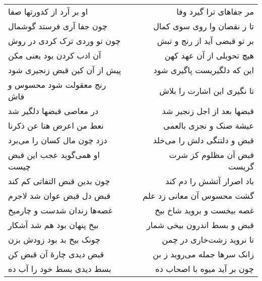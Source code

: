 \begin{center}
\begin{longtable}{l p{0.5cm} r}
\\
او بر آرد از کدورتها صفا
&&
مر جفاهای ترا گیرد وفا
\\
چون جفا آری فرستد گوشمال
&&
تا ز نقصان وا روی سوی کمال
\\
چون تو وردی ترک کردی در روش
&&
بر تو قبضی آید از رنج و تبش
\\
آن ادب کردن بود یعنی مکن
&&
هیچ تحویلی از آن عهد کهن
\\
پیش از آن کین قبض زنجیری شود
&&
این که دلگیریست پاگیری شود
\\
رنج معقولت شود محسوس و فاش
&&
تا نگیری این اشارت را بلاش
\\
در معاصی قبضها دلگیر شد
&&
قبضها بعد از اجل زنجیر شد
\\
نعط من اعرض هنا عن ذکرنا
&&
عیشة ضنک و نجزی بالعمی
\\
دزد چون مال کسان را می‌برد
&&
قبض و دلتنگی دلش را می‌خلد
\\
او همی‌گوید عجب این قبض چیست
&&
قبض آن مظلوم کز شرت گریست
\\
چون بدین قبض التفاتی کم کند
&&
باد اصرار آتشش را دم کند
\\
قبض دل قبض عوان شد لاجرم
&&
گشت محسوس آن معانی زد علم
\\
غصه‌ها زندان شدست و چارمیخ
&&
غصه بیخست و بروید شاخ بیخ
\\
بیخ پنهان بود هم شد آشکار
&&
قبض و بسط اندرون بیخی شمار
\\
چونک بیخ بد بود زودش بزن
&&
تا نروید زشت‌خاری در چمن
\\
قبض دیدی چارهٔ آن قبض کن
&&
زانک سرها جمله می‌روید ز بن
\\
بسط دیدی بسط خود را آب ده
&&
چون بر آید میوه با اصحاب ده
\\
\end{longtable}
\end{center}
